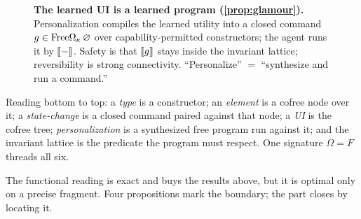 \documentclass[../uxoxo-main]{subfiles}
\begin{document}
\begin{figure}[H]
\centering
{}
\caption{\textbf{The learned UI is a learned program (\cref{prop:glamour}).}
Personalization compiles the learned utility into a closed command
$g\in\mathrm{Free}\Omega_\kappa\,\varnothing$ over capability-permitted constructors; the
agent runs it by $\llbracket - \rrbracket$. Safety is that $\llbracket g \rrbracket$ stays inside the invariant
lattice; reversibility is strong connectivity. ``Personalize'' $=$ ``synthesize and
run a command.''}
\label{fig:glamour}
\end{figure}

\begin{remark}\label{rem:stack}
Reading bottom to top: a \emph{type} is a constructor; an \emph{element} is a cofree
node over it; a \emph{state-change} is a closed command paired against that node; a
\emph{UI} is the cofree tree; \emph{personalization} is a synthesized free program
run against it; and the invariant lattice is the predicate the program must respect.
One signature $\Omega=F$ threads all six.
\end{remark}

The functional reading is exact and buys the results above, but it is optimal only
on a precise fragment. Four propositions mark the boundary; the part closes by
locating it.
\end{document}
